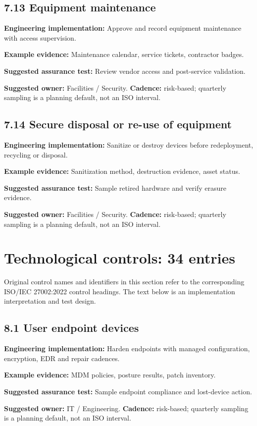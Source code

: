 \documentclass[11pt,letterpaper]{article}
\begin{document}
\subsection{7.13 Equipment maintenance}
\textbf{Engineering implementation:} Approve and record equipment maintenance with access supervision.\par
\textbf{Example evidence:} Maintenance calendar, service tickets, contractor badges.\par
\textbf{Suggested assurance test:} Review vendor access and post-service validation.\par
\textbf{Suggested owner:} Facilities / Security. \textbf{Cadence:} risk-based; quarterly sampling is a planning default, not an ISO interval.\par
{}
\subsection{7.14 Secure disposal or re-use of equipment}
\textbf{Engineering implementation:} Sanitize or destroy devices before redeployment, recycling or disposal.\par
\textbf{Example evidence:} Sanitization method, destruction evidence, asset status.\par
\textbf{Suggested assurance test:} Sample retired hardware and verify erasure evidence.\par
\textbf{Suggested owner:} Facilities / Security. \textbf{Cadence:} risk-based; quarterly sampling is a planning default, not an ISO interval.\par
{}
\section{Technological controls: 34 entries}
\SourceTag Original control names and identifiers in this section refer to the corresponding ISO/IEC 27002:2022 control headings. The text below is an implementation interpretation and test design.\par
\subsection{8.1 User endpoint devices}
\textbf{Engineering implementation:} Harden endpoints with managed configuration, encryption, EDR and repair cadences.\par
\textbf{Example evidence:} MDM policies, posture results, patch inventory.\par
\textbf{Suggested assurance test:} Sample endpoint compliance and lost-device action.\par
\textbf{Suggested owner:} IT / Engineering. \textbf{Cadence:} risk-based; quarterly sampling is a planning default, not an ISO interval.\par
{}
\end{document}
